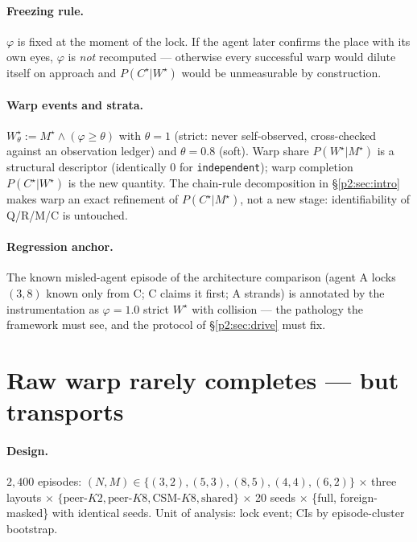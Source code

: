 \documentclass{article}
\newcommand{\method}[1]{\texttt{#1}}
\newcommand{\wstar}{W^{\star}}
\newcommand{\mstar}{M^{\star}}
\newcommand{\cstar}{C^{\star}}
\begin{document}
\paragraph{Freezing rule.} $\varphi$ is fixed at the moment of the
lock. If the agent later confirms the place with its own eyes,
$\varphi$ is \emph{not} recomputed --- otherwise every successful warp
would dilute itself on approach and $P(\cstar|\wstar)$ would be
unmeasurable by construction.

\paragraph{Warp events and strata.} $\wstar_\theta := \mstar \wedge
(\varphi\ge\theta)$ with $\theta{=}1$ (strict: never self-observed,
cross-checked against an observation ledger) and $\theta{=}0.8$
(soft). Warp share $P(\wstar|\mstar)$ is a structural descriptor
(identically $0$ for \method{independent}); warp completion
$P(\cstar|\wstar)$ is the new quantity. The chain-rule decomposition
in \S\ref{p2:sec:intro} makes warp an exact refinement of
$P(\cstar|\mstar)$, not a new stage: identifiability of Q/R/M/C is
untouched.

\paragraph{Regression anchor.} The known misled-agent episode of the
architecture comparison (agent A locks $(3,8)$ known only from C; C
claims it first; A strands) is annotated by the instrumentation as
$\varphi=1.0$ strict $\wstar$ with collision --- the pathology the
framework must see, and the protocol of \S\ref{p2:sec:drive} must fix.

\section{Raw warp rarely completes --- but transports}
\label{p2:sec:raw}

\paragraph{Design.} $2{,}400$ episodes: $(N,M)\in\{(3,2),(5,3),(8,5),
(4,4),(6,2)\}$ $\times$ three layouts $\times$
$\{\text{peer-}K2,\text{peer-}K8,\text{CSM-}K8,\text{shared}\}$
$\times$ 20 seeds $\times$ \{full, foreign-masked\} with identical
seeds. Unit of analysis: lock event; CIs by episode-cluster bootstrap.
\end{document}
